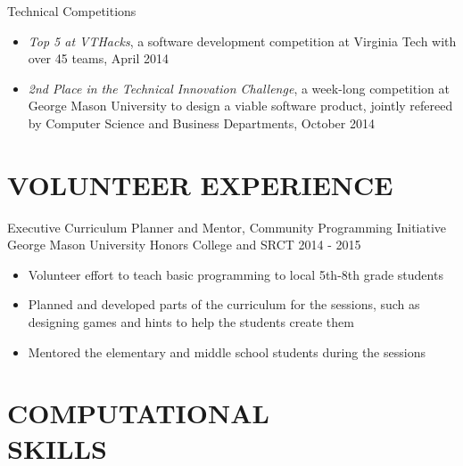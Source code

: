 \documentclass[margin, 10pt]{res} %
\begin{document}
\begin{resume}
Technical Competitions
\begin{itemize} \itemsep -2pt %
\item {\sl Top 5 at VTHacks}, a software development competition at Virginia Tech with over 45 teams, April 2014
\item {\sl 2nd Place in the Technical Innovation Challenge}, a week-long competition at George Mason University to design a viable software product, jointly refereed by Computer Science and Business Departments, October 2014
\end{itemize}


\section{VOLUNTEER EXPERIENCE}

Executive Curriculum Planner and Mentor, Community Programming Initiative \\ George Mason University Honors College and SRCT
 \hfill 2014 - 2015
\begin{itemize} \itemsep -2pt %
\item Volunteer effort to teach basic programming to local 5th-8th grade students
\item Planned and developed parts of the curriculum for the sessions, such as designing games and hints to help the students create them
\item Mentored the elementary and middle school students during the sessions
\end{itemize} 


\section{COMPUTATIONAL \\ SKILLS} 


\end{resume}
\end{document}
